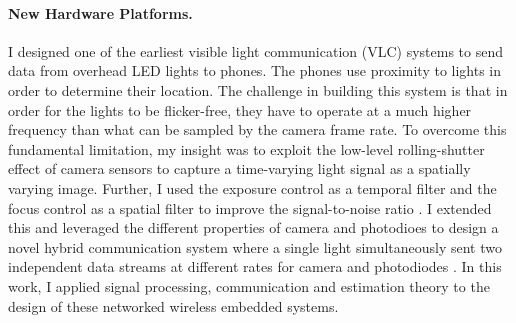 \documentclass[10pt]{article}
\begin{document}

\paragraph{New Hardware Platforms. }

I designed one of the earliest visible light communication (VLC) systems to send data from overhead LED lights to phones. The phones use proximity to lights in order to determine their location.  The challenge in building this system is that in order for the lights to be flicker-free, they have to operate at a much higher frequency than what can be sampled by the camera frame rate. 
To overcome this fundamental limitation, my insight was to exploit the low-level rolling-shutter effect of camera sensors to capture a time-varying light signal as a spatially varying image. Further, I used the exposure control as a temporal filter and the focus control as a spatial filter to improve the signal-to-noise ratio \cite{rajagopal2014visual, rajagopal2014demonstration}. I extended this and leveraged the different properties of camera and photodioes to design a novel hybrid communication system where a single light simultaneously sent two independent data streams at different rates for camera and photodiodes \cite{rajagopal2014hybrid}. In this work, I applied signal processing, communication and estimation theory to the design of these networked wireless embedded systems.
\end{document}
